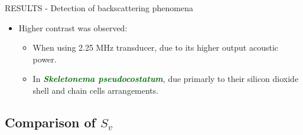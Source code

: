 \documentclass[handout]{beamer}
\newcommand\Fontable{\fontsize{9}{10}\selectfont}
\begin{document}
\begin{frame}{RESULTS - Detection of backscattering phenomena}
\Fontable
{}

\vspace{1pc}
\centering
{}

\begin{itemize}
\item<3-> Higher contrast was observed:
\begin{itemize}
\Fontable
\item<3-> When using 2.25 MHz transducer, due to its higher output acoustic power.
\item<3-> In \textcolor{darkgreen}{{\bf \textit{Skeletonema pseudocostatum}}}, due primarly to their silicon dioxide shell and chain cells arrangements.
\end{itemize}
\end{itemize}

\end{frame}

\subsection{Comparison of $S_v$}
\end{document}
